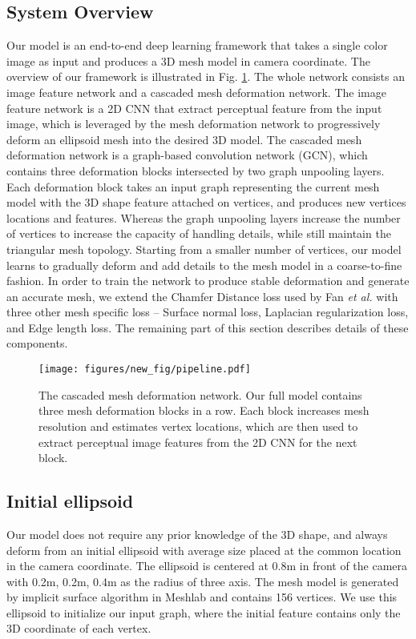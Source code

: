 \documentclass[runningheads]{llncs}
\def\etal{\emph{et al.}}
\newcommand{\figref}[1]{Fig. \ref{#1}}
\begin{document}
\subsection{System Overview}
\label{sec:overiew}
Our model is an end-to-end deep learning framework that takes a single color image as input and produces a 3D mesh model in camera coordinate. The overview of our framework is illustrated in \figref{fig:cmrn}. 
The whole network consists an image feature network and a cascaded mesh deformation network.
The image feature network is a 2D CNN that extract perceptual feature from the input image, which is leveraged by the mesh deformation network to progressively deform an ellipsoid mesh into the desired 3D model.
The cascaded mesh deformation network is a graph-based convolution network (GCN), which contains three deformation blocks intersected by two graph unpooling layers.
Each deformation block takes an input graph representing the current mesh model with the 3D shape feature attached on vertices, and produces new vertices locations and features.
Whereas the graph unpooling layers increase the number of vertices to increase the capacity of handling details, while still maintain the triangular mesh topology.
Starting from a smaller number of vertices, our model learns to gradually deform and add details to the mesh model in a coarse-to-fine fashion.
In order to train the network to produce stable deformation and generate an accurate mesh, we extend the Chamfer Distance loss used by Fan \etal \cite{FanSG16} with three other mesh specific loss -- Surface normal loss, Laplacian regularization loss, and Edge length loss.
The remaining part of this section describes details of these components.

\begin{figure}[t]
\centering
\texttt{[image: figures/new\_fig/pipeline.pdf]}
\caption{The cascaded mesh deformation network. Our full model contains three mesh deformation blocks in a row. Each block increases mesh resolution and estimates vertex locations, which are then used to extract perceptual image features from the 2D CNN for the next block.}
\label{fig:cmrn}
\end{figure}


\subsection{Initial ellipsoid}
\label{sec:init}
Our model does not require any prior knowledge of the 3D shape, and always deform from an initial ellipsoid with average size placed at the common location in the camera coordinate.
The ellipsoid is centered at 0.8m in front of the camera with 0.2m, 0.2m, 0.4m as the radius of three axis.
The mesh model is generated by implicit surface algorithm in Meshlab \cite{meshlab} and contains 156 vertices.
We use this ellipsoid to initialize our input graph, where the initial feature contains only the 3D coordinate of each vertex.
\end{document}
